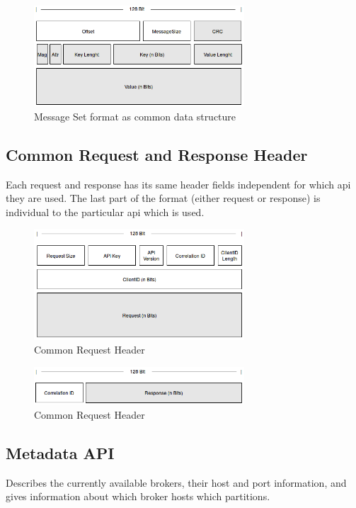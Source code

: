 \begin{figure}[H]
    \centering
    \includegraphics[width=0.7\textwidth]{images/protocol-messageSet.png}
    \caption{Message Set format as common data structure}
    \label{fig:protocol-request-header.png}
\end{figure}

\subsection{Common Request and Response Header}
Each request and response has its same header fields independent for which api they are used. 
The last part of the format (either request or response) is individual to the particular api which is used. 
\begin{figure}[H]
    \centering
    \includegraphics[width=0.7\textwidth]{images/protocol-request-header.png}
    \caption{Common Request Header}
    \label{fig:protocol-request-header.png}
\end{figure}

\begin{figure}[H]
    \centering
    \includegraphics[width=0.7\textwidth]{images/protocol-response-header.png}
    \caption{Common Request Header}
    \label{fig:protocol-response-header.png}
\end{figure}

\subsection{Metadata API}
Describes the currently available brokers, their host and port information, and
gives information about which broker hosts which partitions.

